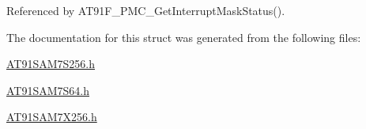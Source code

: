 Referenced by AT91F\_\-PMC\_\-GetInterruptMaskStatus().

The documentation for this struct was generated from the following files:\begin{CompactItemize}
\item 
\hyperlink{AT91SAM7S256_8h}{AT91SAM7S256.h}\item 
\hyperlink{AT91SAM7S64_8h}{AT91SAM7S64.h}\item 
\hyperlink{AT91SAM7X256_8h}{AT91SAM7X256.h}\end{CompactItemize}
